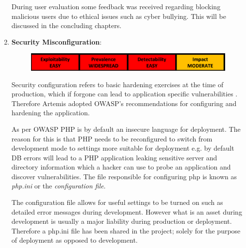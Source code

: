 \begin{enumerate}
    During user evaluation some feedback was received regarding blocking malicious users due to ethical issues such as cyber bullying. This will be discussed in the concluding chapters.
    
    \item \textbf{Security Misconfiguration}:
    
    \begin{figure}[h]
    	\centering
    	\includegraphics[scale=0.5,center]{chapters/chapter03/figures/brokenAccess.png}
    	\label{Security Misconfiguration}
    \end{figure}
    
    Security configuration refers to basic hardening exercises at the time of production, which if forgone can lead to application specific vulnerabilities \cite{OWASP2017}. Therefore Artemis adopted OWASP's recommendations for configuring and hardening the application.
    
    As per OWASP \cite{OWASPa} PHP is by default an insecure language for deployment. The reason for this is that PHP needs to be reconfigured to switch from development mode to settings more suitable for deployment e.g. by default DB errors will lead to a PHP application leaking sensitive server and directory information which a hacker can use to probe an application and discover vulnerabilities. The file responsible for configuring php is known as \textit{php.ini} or the \textit{configuration file}\cite{PHPa}.
    
    The configuration file allows for useful settings to be turned on such as detailed error messages during development. However what is an asset during development is usually a major liability during production or deployment. Therefore a php.ini file has been shared in the project; solely for the purpose of deployment as opposed to development.
    

\end{enumerate}
